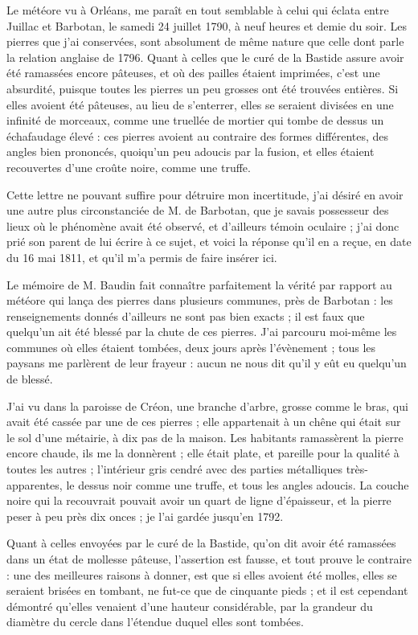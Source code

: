 \documentclass[a4paper, 12pt, oneside, french]{article}
\begin{document}
\og Le météore vu à Orléans, me paraît en tout semblable à celui qui éclata entre Juillac et Barbotan, le samedi 24 juillet 1790, à neuf heures et demie du soir. Les pierres que j'ai conservées, sont absolument de même nature que celle dont parle la relation anglaise de 1796. Quant à celles que le curé de la Bastide assure avoir été ramassées encore pâteuses, et où des pailles étaient imprimées, c'est une absurdité, puisque toutes les pierres un peu grosses ont été trouvées entières. Si elles avoient été pâteuses, au lieu de s'enterrer, elles se seraient divisées en une infinité de morceaux, comme une truellée de mortier qui tombe de dessus un échafaudage élevé : ces pierres avoient au contraire des formes différentes, des angles bien prononcés, quoiqu’un peu adoucis par la fusion, et elles étaient recouvertes d'une croûte noire, comme une truffe. \fg

Cette lettre ne pouvant suffire pour détruire mon incertitude, j'ai désiré en avoir une autre plus circonstanciée de M. de Barbotan, que je savais possesseur des lieux où le phénomène avait été observé, et d'ailleurs témoin oculaire ; j'ai donc prié son parent de lui écrire à ce sujet, et voici la réponse qu'il en a reçue, en date du 16 mai 1811, et qu'il m'a permis de faire insérer ici.

\og Le mémoire de M. Baudin fait connaître parfaitement la vérité par rapport au météore qui lança des pierres dans plusieurs communes, près de Barbotan : les renseignements donnés d'ailleurs ne sont pas bien exacts ; il est faux que quelqu'un ait été blessé par la chute de ces pierres. J'ai parcouru moi-même les communes où elles étaient tombées, deux jours après l'évènement ; tous les paysans me parlèrent de leur frayeur : aucun ne nous dit qu'il y eût eu quelqu'un de blessé. \fg

\og J'ai vu dans la paroisse de Créon, une branche d'arbre, grosse comme le bras, qui avait été cassée par une de ces pierres ; elle appartenait à un chêne qui était sur le sol d'une métairie, à dix pas de la maison. Les habitants ramassèrent la pierre encore chaude, ils me la donnèrent ; elle était plate, et pareille pour la qualité à toutes les autres ; l'intérieur gris cendré avec des parties métalliques très-apparentes, le dessus noir comme une truffe, et tous les angles adoucis. La couche noire qui la recouvrait pouvait avoir un quart de ligne d'épaisseur, et la pierre peser à peu près dix onces ; je l'ai gardée jusqu'en 1792. \fg

\og Quant à celles envoyées par le curé de la Bastide, qu'on dit avoir été ramassées dans un état de mollesse pâteuse, l'assertion est fausse, et tout prouve le contraire : une des meilleures raisons à donner, est que si elles avoient été molles, elles se seraient brisées en tombant, ne fut-ce que de cinquante pieds ; et il est cependant démontré qu'elles venaient d'une hauteur considérable, par la grandeur du diamètre du cercle dans l'étendue duquel elles sont tombées. \fg
\end{document}
